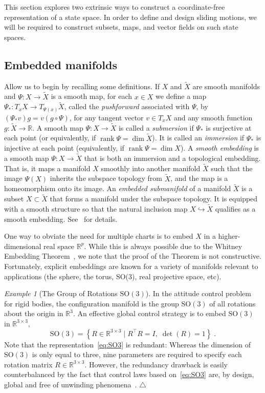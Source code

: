 \documentclass{article}
\theoremstyle{definition}
\theoremstyle{remark}
\newtheorem{example}{Example}
\newcommand\xqed[1]{%
  \leavevmode\unskip\penalty9999 \hbox{}\nobreak\hfill
  \quad\hbox{#1}}
\newcommand\eexa{\xqed{$\triangle$}}
\newcommand{\DI}{\tilde{X}}	%
\newcommand{\MA}{X}	%
\newcommand{\RR}{\mathbb{R}}	%
\newcommand{\SO}{\mathrm{SO}} %
\DeclareMathOperator{\rank}{rank}
\begin{document}
This section explores two extrinsic ways to construct a coordinate-free representation of
a state space. In order to define and design sliding motions, we will be required to construct subsets, maps, and vector fields on such state spaces.

\subsection{Embedded manifolds}

Allow us to begin by recalling some definitions. If $\MA$ and $\DI$ are smooth manifolds and $\Psi:\MA \to \DI$
is a smooth map, for each $x \in \MA$ we define a map $\Psi_* : T_x \MA \to T_{\Psi(x)}\DI$, called the 
\emph{pushforward} associated with $\Psi$, by $(\Psi_* v)g = v(g\circ \Psi)$, for any tangent vector $v \in T_xX$ and 
any smooth function $g : \DI \to \RR$. A smooth map $\Psi : \MA \to \DI$ is called 
a \emph{submersion} if $\Psi_*$ is surjective at each point (or equivalently, if $\rank \Psi = \dim \DI$). It 
is called an \emph{immersion} if $\Psi_*$ is injective at each point (equivalently, if $\rank \Psi = \dim \MA$).
A \emph{smooth embedding} is a smooth map $\Psi : \MA \to \DI$ that is both an immersion and a topological
embedding. That is, it maps a manifold $\MA$ smoothly into another manifold $\DI$ such that the image
$\Psi(\MA)$ inherits the subspace topology from $\DI$, and the map is a homeomorphism onto its image. An
\emph{embedded submanifold} of a manifold $\DI$ is a subset $\MA \subset \DI$ that forms a manifold under
the subspace topology. It is equipped with a smooth structure so that the natural inclusion map 
$\MA \hookrightarrow \DI$ qualifies as a smooth embedding. See~\cite{lee} for details.

One way to obviate the need for multiple charts is to embed $\MA$ in a higher-dimensional real
space $\RR^p$. While this is always possible due to the Whitney Embedding Theorem~\cite[Thm. 6.15]{lee}, we note that
the proof of the Theorem is not constructive. Fortunately, explicit embeddings are known for a variety of manifolds relevant to applications
(the sphere, the torus, SO(3), real projective space, etc).

\begin{example}[The Group of Rotations $\SO(3)$]
 In the attitude control problem for rigid bodies, the configuration manifold is the group $\SO(3)$ of all
 rotations about the origin in $\RR^3$. An effective global control strategy is to embed $\SO(3)$ 
 in $\RR^{3 \times 3}$,
 \begin{equation} \label{eq:SO3}
  \SO(3) = \left\{ R \in \RR^{3\times 3} \mid R^\top R = I, \; \det(R) = 1 \right\} \;.
 \end{equation}
 Note that the representation~\eqref{eq:SO3} is redundant: Whereas the dimension of $\SO(3)$ is only
 equal to three, nine parameters are required to specify each rotation matrix $R \in \RR^{3\times 3}$.
 However, the redundancy drawback is easily counterbalanced by the fact that control laws based on~\eqref{eq:SO3}
 are, by design, global and free of unwinding phenomena~\cite{chaturvedi2011,gomez2019b}. \eexa
\end{example}
\end{document}

